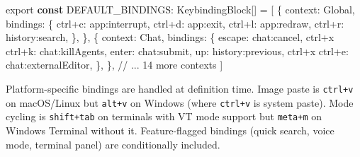 \documentclass[
  english,
  11pt,
  letterpaper,
]{book}
\newenvironment{Shaded}{\begin{snugshade}}{\end{snugshade}}
\newcommand{\CommentTok}[1]{\textcolor[rgb]{0.37,0.37,0.37}{#1}}
\newcommand{\ImportTok}[1]{\textcolor[rgb]{0.00,0.46,0.62}{#1}}
\newcommand{\KeywordTok}[1]{\textcolor[rgb]{0.00,0.23,0.31}{\textbf{#1}}}
\newcommand{\NormalTok}[1]{\textcolor[rgb]{0.00,0.23,0.31}{#1}}
\newcommand{\OperatorTok}[1]{\textcolor[rgb]{0.37,0.37,0.37}{#1}}
\newcommand{\StringTok}[1]{\textcolor[rgb]{0.13,0.47,0.30}{#1}}
\begin{document}
\begin{Shaded}
\begin{Highlighting}[]
\ImportTok{export} \KeywordTok{const}\NormalTok{ DEFAULT\_BINDINGS}\OperatorTok{:}\NormalTok{ KeybindingBlock[] }\OperatorTok{=}\NormalTok{ [}
\NormalTok{  \{}
\NormalTok{    context}\OperatorTok{:} \StringTok{\textquotesingle{}Global\textquotesingle{}}\OperatorTok{,}
\NormalTok{    bindings}\OperatorTok{:}\NormalTok{ \{}
      \StringTok{\textquotesingle{}ctrl+c\textquotesingle{}}\OperatorTok{:} \StringTok{\textquotesingle{}app:interrupt\textquotesingle{}}\OperatorTok{,}
      \StringTok{\textquotesingle{}ctrl+d\textquotesingle{}}\OperatorTok{:} \StringTok{\textquotesingle{}app:exit\textquotesingle{}}\OperatorTok{,}
      \StringTok{\textquotesingle{}ctrl+l\textquotesingle{}}\OperatorTok{:} \StringTok{\textquotesingle{}app:redraw\textquotesingle{}}\OperatorTok{,}
      \StringTok{\textquotesingle{}ctrl+r\textquotesingle{}}\OperatorTok{:} \StringTok{\textquotesingle{}history:search\textquotesingle{}}\OperatorTok{,}
\NormalTok{    \}}\OperatorTok{,}
\NormalTok{  \}}\OperatorTok{,}
\NormalTok{  \{}
\NormalTok{    context}\OperatorTok{:} \StringTok{\textquotesingle{}Chat\textquotesingle{}}\OperatorTok{,}
\NormalTok{    bindings}\OperatorTok{:}\NormalTok{ \{}
      \StringTok{\textquotesingle{}escape\textquotesingle{}}\OperatorTok{:} \StringTok{\textquotesingle{}chat:cancel\textquotesingle{}}\OperatorTok{,}
      \StringTok{\textquotesingle{}ctrl+x ctrl+k\textquotesingle{}}\OperatorTok{:} \StringTok{\textquotesingle{}chat:killAgents\textquotesingle{}}\OperatorTok{,}
      \StringTok{\textquotesingle{}enter\textquotesingle{}}\OperatorTok{:} \StringTok{\textquotesingle{}chat:submit\textquotesingle{}}\OperatorTok{,}
      \StringTok{\textquotesingle{}up\textquotesingle{}}\OperatorTok{:} \StringTok{\textquotesingle{}history:previous\textquotesingle{}}\OperatorTok{,}
      \StringTok{\textquotesingle{}ctrl+x ctrl+e\textquotesingle{}}\OperatorTok{:} \StringTok{\textquotesingle{}chat:externalEditor\textquotesingle{}}\OperatorTok{,}
\NormalTok{    \}}\OperatorTok{,}
\NormalTok{  \}}\OperatorTok{,}
  \CommentTok{// ... 14 more contexts}
\NormalTok{]}
\end{Highlighting}
\end{Shaded}

Platform-specific bindings are handled at definition time. Image paste
is \texttt{ctrl+v} on macOS/Linux but \texttt{alt+v} on Windows (where
\texttt{ctrl+v} is system paste). Mode cycling is \texttt{shift+tab} on
terminals with VT mode support but \texttt{meta+m} on Windows Terminal
without it. Feature-flagged bindings (quick search, voice mode, terminal
panel) are conditionally included.
\end{document}

